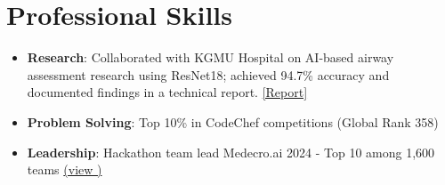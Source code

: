 \documentclass[letterpaper,10pt]{article}
\begin{document}
\section*{Professional Skills}
\vspace{-2pt}
\begin{itemize}[noitemsep, topsep=2pt, leftmargin=0.15in]
  \item \textbf{Research}: Collaborated with KGMU Hospital on AI-based airway assessment research using ResNet18; achieved 94.7\% accuracy and documented findings in a technical report. \href{https://drive.google.com/file/d/1sULxnZs76b40OyWZwKwSuOMdOuckTRt8/view?usp=drive_link}{\textcolor{linkcolor}{[Report]}} 
  \item \textbf{Problem Solving}: Top 10\% in CodeChef competitions (Global Rank 358)
  \item \textbf{Leadership}: Hackathon team lead Medecro.ai 2024 - Top 10 among 1,600 teams \href{https://drive.google.com/file/d/18becaaeP6snzd1TeXW10usLLK0kVPrZ9/view?usp=drive_link}{(view \faExternalLink*)}
\end{itemize}
\end{document}
